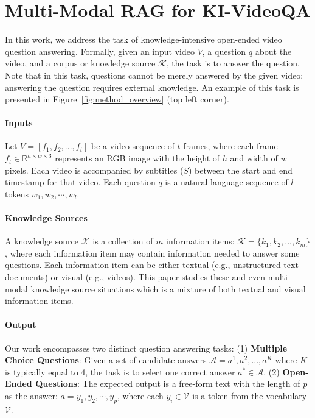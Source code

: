 \section{Multi-Modal RAG for KI-VideoQA}
\label{sec:method}
In this work, we address the task of knowledge-intensive open-ended video question answering. Formally, given an input video $V$, a question $q$ about the video, and a corpus or knowledge source $\mathcal{K}$, the task is to answer the question. Note that in this task, questions cannot be merely answered by the given video; answering the question requires external knowledge. An example of this task is presented in Figure~\ref{fig:method_overview} (top left corner).

\paragraph{\textbf{Inputs}}
Let $V = [f_1, f_2, ..., f_t]$ be a video sequence of $t$ frames, where each frame $f_t \in \mathbb{R}^{h \times w \times 3}$ represents an RGB image with the height of $h$ and width of $w$ pixels. Each video is accompanied by subtitles ($S$) between the start and end timestamp for that video. Each question $q$ is a natural language sequence of $l$ tokens ${w_1, w_2, \cdots, w_l}$.

\paragraph{\textbf{Knowledge Sources}}
A knowledge source $\mathcal{K}$ is a collection of $m$ information items: $\mathcal{K} = \{k_1, k_2, ..., k_m\}$, where each information item may contain information needed to answer some questions. Each information item can be either textual (e.g., unstructured text documents) or visual (e.g., videos). This paper studies these and even multi-modal knowledge source situations which is a mixture of both textual and visual information items. 

\paragraph{\textbf{Output}}
Our work encompasses two distinct question answering tasks: (1) \textbf{Multiple Choice Questions}: Given a set of candidate answers $\mathcal{A} = {a^1, a^2, ..., a^K}$ where $K$ is typically equal to 4, the task is to select one correct answer $a^* \in \mathcal{A}$. (2) \textbf{Open-Ended Questions}: The expected output is a free-form text with the length of $p$ as the answer: $a = {y_1, y_2, \cdots, y_p}$, where each $y_i \in \mathcal{V}$ is a token from the vocabulary $\mathcal{V}$.


